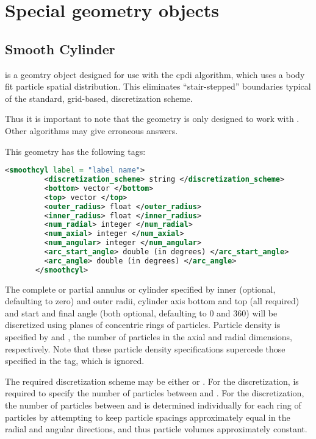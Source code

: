 \section{Special geometry objects} \label{Sec:SpecialGeometryObjects}
\subsection{Smooth Cylinder}
 is a geomtry object designed for use with
the cpdi algorithm, which uses a body fit particle spatial
distribution.  This eliminates ``stair-stepped'' boundaries typical of
the standard, grid-based, discretization scheme.  
\begin{NoteBox}
Thus it is
  important to note that the  geometry is only designed to work with
  . Other
  algorithms may give erroneous answers.
\end{NoteBox}

This geometry has the following tags:

\begin{lstlisting}[language=XML]
	   <smoothcyl label = "label name">
	     <discretization_scheme> string </discretization_scheme>
	     <bottom> vector </bottom>
	     <top> vector </top>
	     <outer_radius> float </outer_radius>
	     <inner_radius> float </inner_radius>
	     <num_radial> integer </num_radial>
	     <num_axial> integer </num_axial>
	     <num_angular> integer </num_angular>
	     <arc_start_angle> double (in degrees) </arc_start_angle>
	     <arc_angle> double (in degrees) </arc_angle>
	   </smoothcyl>
\end{lstlisting}

The complete or partial annulus or cylinder specified by inner
(optional, defaulting to zero) and outer radii, cylinder axis bottom
and top (all required) and start and final angle (both optional,
defaulting to 0 and 360) will be discretized using planes of
concentric rings of particles.  Particle density is specified by  and , the number of
particles in the axial and radial dimensions, respectively.
  Note that these particle density specifications
supercede those specified in the 
tag, which is ignored.

The required discretization scheme may be either 
 or .  For the
 discretization,   is required to specify the number of particles between  and .  For the  discretization, the number of
particles between  and 
is determined individually for each ring of particles by
attempting to keep particle spacings approximately equal in the radial
and angular directions, and thus particle volumes approximately
constant.

